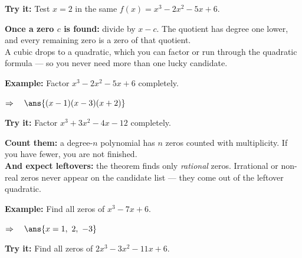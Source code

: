 \documentclass[12pt]{article}
\begin{document}
\begin{tryitbox}
\textbf{Try it:} \quad Test $x = 2$ in the same $f(x) = x^{3} - 2x^{2} - 5x + 6$.\\[2pt]
\end{tryitbox}


\begin{formulabox}
\textbf{Once a zero $c$ is found:} divide by $x - c$. The quotient has degree one
lower, and every remaining zero is a zero of that quotient.\\[3pt]
A cubic drops to a quadratic, which you can factor or run through the quadratic
formula --- so you never need more than one lucky candidate.
\end{formulabox}

\begin{examplebox}
\textbf{Example:} \quad Factor $x^{3} - 2x^{2} - 5x + 6$ completely.

$\Rightarrow\quad \ans{(x-1)(x-3)(x+2)}$
\end{examplebox}

\begin{tryitbox}
\textbf{Try it:} \quad Factor $x^{3} + 3x^{2} - 4x - 12$ completely.\\[2pt]
\end{tryitbox}


\begin{formulabox}
\textbf{Count them:} a degree-$n$ polynomial has $n$ zeros counted with
multiplicity. If you have fewer, you are not finished.\\[3pt]
\textbf{And expect leftovers:} the theorem finds only \textit{rational} zeros.
Irrational or non-real zeros never appear on the candidate list --- they come
out of the leftover quadratic.
\end{formulabox}

\begin{examplebox}
\textbf{Example:} \quad Find all zeros of $x^{3} - 7x + 6$.

$\Rightarrow\quad \ans{x = 1,\ 2,\ -3}$
\end{examplebox}

\begin{tryitbox}
\textbf{Try it:} \quad Find all zeros of $2x^{3} - 3x^{2} - 11x + 6$.\\[2pt]
\end{tryitbox}
\end{document}
